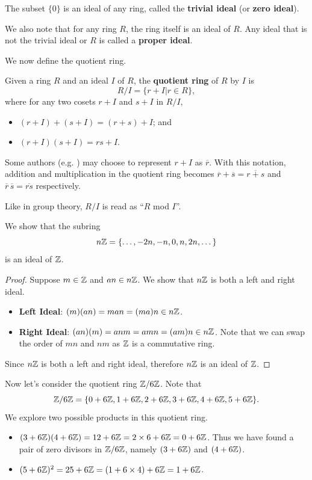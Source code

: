 \begin{example}
    The subset $\{0\}$ is an ideal of any ring, called the \textbf{trivial ideal} (or \textbf{zero ideal}).
\end{example}
We also note that for any ring $R$, the ring itself is an ideal of $R$. Any ideal that is not the trivial ideal or $R$ is called a \textbf{proper ideal}.

We now define the quotient ring.
\begin{definition}
    Given a ring $R$ and an ideal $I$ of $R$, the \textbf{quotient ring} of $R$ by $I$ is
    \[
        R/I = \{r + I \vert r \in R\},
    \]
    where for any two cosets $r+I$ and $s+I$ in $R/I$,
    \begin{itemize}
        \item $(r+I) + (s+I) = (r+s)+I$; and
        \item $(r+I)(s+I) = rs+I$.
    \end{itemize}
\end{definition}
\begin{remark}
    Some authors (e.g. \cite[p.~243]{dummit_foote_2004}) may choose to represent $r + I$ as $\overline{r}$. With this notation, addition and multiplication in the quotient ring becomes $\overline{r}+\overline{s} = \overline{r+s}$ and $\overline{r}\,\overline{s} = \overline{rs}$ respectively.
\end{remark}
\begin{remark}
    Like in group theory, $R/I$ is read as ``$R$ mod $I$''.
\end{remark}
\begin{example}
    We show that the subring
    \[
        n\mathbb{Z} = \{\dots, -2n, -n, 0, n, 2n, \dots\}
    \]
    is an ideal of $\mathbb{Z}$.
    \begin{proof}
        Suppose $m \in \mathbb{Z}$ and $an \in n\mathbb{Z}$. We show that $n\mathbb{Z}$ is both a left and right ideal.
        \begin{itemize}
            \item \textbf{Left Ideal}: $(m)(an) = man = (ma)n \in n\mathbb{Z}$.
            \item \textbf{Right Ideal}: $(an)(m) = anm = amn = (am)n \in n\mathbb{Z}$. Note that we can swap the order of $mn$ and $nm$ as $\mathbb{Z}$ is a commutative ring.
        \end{itemize}
        Since $n\mathbb{Z}$ is both a left and right ideal, therefore $n\mathbb{Z}$ is an ideal of $\mathbb{Z}$.
    \end{proof}

    Now let's consider the quotient ring $\mathbb{Z}/6\mathbb{Z}$. Note that
    \[
        \mathbb{Z}/6\mathbb{Z} = \{0 + 6\mathbb{Z}, 1+6\mathbb{Z}, 2+6\mathbb{Z}, 3+6\mathbb{Z}, 4+6\mathbb{Z}, 5+6\mathbb{Z}\}.
    \]
    We explore two possible products in this quotient ring.
    \begin{itemize}
        \item $(3+6\mathbb{Z})(4+6\mathbb{Z}) = 12+6\mathbb{Z} = 2\times 6 + 6\mathbb{Z} = 0 + 6\mathbb{Z}$. Thus we have found a pair of zero divisors in $\mathbb{Z}/6\mathbb{Z}$, namely $(3+6\mathbb{Z})$ and $(4+6\mathbb{Z})$.
        \item $(5+6\mathbb{Z})^2 = 25+6\mathbb{Z} = (1 + 6\times4) + 6\mathbb{Z} = 1 + 6\mathbb{Z}$.
    \end{itemize}
\end{example}
